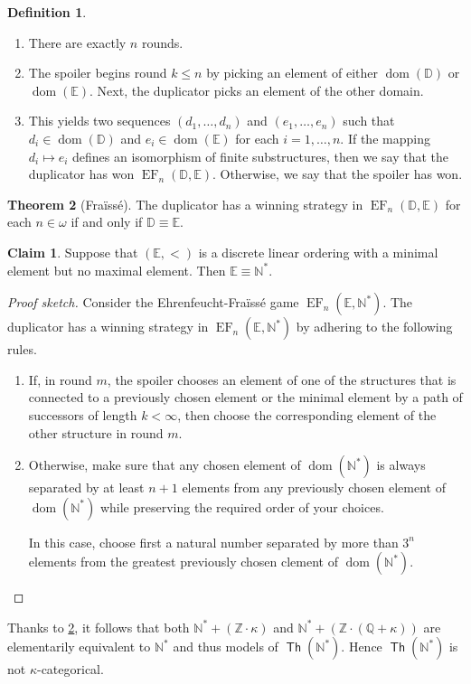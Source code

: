 \documentclass[10pt,letterpaper,cm]{nupset}
\theoremstyle{definition}
\newtheorem{definition}{Definition}
\theoremstyle{theorem}
\newtheorem{theorem}[definition]{Theorem}
\newtheorem{claim}{Claim}
\theoremstyle{remark}
\newcommand{\D}{\mathbb D}
\newcommand{\E}{\mathbb E}
\newcommand{\N}{\mathbb N}
\newcommand{\Q}{\mathbb Q}
\newcommand{\Z}{\mathbb Z}
\newcommand{\1}{\mathbb{1}}
\renewcommand{\i}{\vec i}
\newcommand{\0}{\vec 0}
\DeclareMathOperator{\dom}{dom}
\DeclareMathOperator{\ef}{EF}
\DeclareMathOperator{\thh}{\mathsf{Th}}
\begin{document}
\begin{solution}
\begin{definition}
\begin{enumerate}[label=(\alph*)]
\item There are exactly $n$ rounds.
\item The spoiler begins round $k\leq n$ by picking an element of either $\dom(\D)$ or $\dom(\E)$. Next, the duplicator picks an element of the other domain.
\item This yields two sequences $\left(d_1, \ldots, d_n\right)$ and $\left(e_1, \ldots, e_n\right)$ such that $d_i\in \dom(\D)$ and $e_i\in \dom(\E)$ for each $i=1, \ldots, n$.  If the mapping $d_i \mapsto e_i$ defines an isomorphism of finite substructures, then we say that the duplicator has won $\ef_n(\D, \E)$. Otherwise, we say that the spoiler has won.
\end{enumerate}
\end{definition}

\begin{theorem}[Fra\"{\i}ss\'e]\label{EF}
The duplicator has a winning strategy in $\ef_n(\D, \E)$ for each $n\in \omega$ if and only if $\D \equiv \E$.
\end{theorem}

\begin{claim}
Suppose that $\left(\E, <\right)$ is a discrete linear ordering with a minimal element but no maximal element. Then $\E \equiv \N^{\ast}$.
\end{claim}
\begin{proof}[Proof sketch]
Consider the Ehrenfeucht-Fra\"{\i}ss\'e  game $\ef_n(\E, \N^{\ast})$. The duplicator has a winning strategy in $\ef_n(\E, \N^{\ast})$ by adhering to the following rules.
\begin{enumerate}[label=(\roman*)]
\item If, in round $m$, the spoiler chooses an element of one of the structures that is connected to a previously chosen element or the minimal element by a path of successors of length $k<\infty$, then choose the corresponding element of the other structure in round $m$.
\item Otherwise, make sure that any chosen element of $\dom(\N^{\ast})$ is always separated by at least $n+1$ elements from any previously chosen element of $\dom(\N^{\ast})$ while preserving the required order of your choices. 

In this case, choose first a natural number separated by more than $3^n$ elements from the greatest previously chosen clement of $\dom(\N^{\ast})$.
\end{enumerate}
\end{proof}
Thanks to \cref{EF}, it follows that both $ {\N^{\ast} + \left(\Z \cdot \kappa\right)}$ and ${\N^{\ast} +  \left(\Z \cdot \left(\Q +\kappa\right)\right)}$ are elementarily equivalent to $\N^{\ast}$ and thus models of $\thh(\N^{\ast})$. Hence $\thh(\N^{\ast})$ is not $\kappa$-categorical. 
\end{solution}
\end{document}
